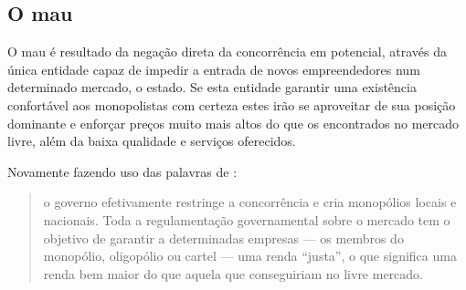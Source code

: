 \subsection{O mau}

O mau é resultado da negação direta da concorrência em potencial,
através da única entidade capaz de impedir a entrada de novos
empreendedores num determinado mercado, o estado. Se esta entidade
garantir uma existência confortável aos monopolistas com certeza estes
irão se aproveitar de sua posição dominante e enforçar preços muito
mais altos do que os encontrados no mercado livre, além da baixa
qualidade e serviços oferecidos.

Novamente fazendo uso das palavras de \cite{monopoly-bad-good}:


\begin{quote}
  o governo efetivamente restringe a concorrência e cria monopólios
  locais e nacionais.  Toda a regulamentação governamental sobre o
  mercado tem o objetivo de garantir a determinadas empresas — os
  membros do monopólio, oligopólio ou cartel — uma renda ``justa'', o
  que significa uma renda bem maior do que aquela que conseguiriam no
  livre mercado.
\end{quote}

 
